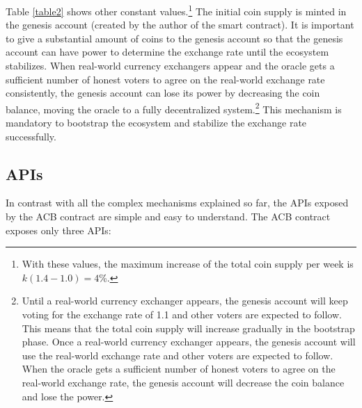 \documentclass[dvipdfmx,a4paper]{article}
\begin{document}
Table \ref{table2} shows other constant values.\footnote{With these values, the maximum increase of the total coin supply per week is $k(1.4 - 1.0)=4$\%.} The initial coin supply is minted in the genesis account (created by the author of the smart contract). It is important to give a substantial amount of coins to the genesis account so that the genesis account can have power to determine the exchange rate until the ecosystem stabilizes. When real-world currency exchangers appear and the oracle gets a sufficient number of honest voters to agree on the real-world exchange rate consistently, the genesis account can lose its power by decreasing the coin balance, moving the oracle to a fully decentralized system.\footnote{Until a real-world currency exchanger appears, the genesis account will keep voting for the exchange rate of 1.1 and other voters are expected to follow. This means that the total coin supply will increase gradually in the bootstrap phase. Once a real-world currency exchanger appears, the genesis account will use the real-world exchange rate and other voters are expected to follow. When the oracle gets a sufficient number of honest voters to agree on the real-world exchange rate, the genesis account will decrease the coin balance and lose the power.} This mechanism is mandatory to bootstrap the ecosystem and stabilize the exchange rate successfully.

\subsection{APIs}

In contrast with all the complex mechanisms explained so far, the APIs exposed by the ACB contract are simple and easy to understand. The ACB contract exposes only three APIs:
\end{document}

